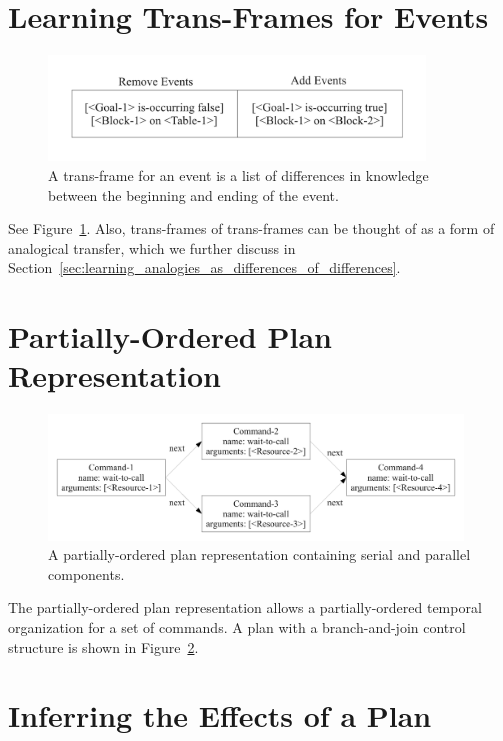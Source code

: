 \section{Learning Trans-Frames for Events}
\label{sec:learning_trans_frames_for_events}

\begin{figure}[bth]
  \center
  \includegraphics[width=10cm]{gfx/transframe}
  \caption[A trans-frame for an event]{A trans-frame for an event is a
    list of differences in knowledge between the beginning and ending
    of the event.}
  \label{fig:transframe}
\end{figure}

See Figure~\ref{fig:transframe}.  Also, trans-frames of trans-frames
can be thought of as a form of analogical transfer, which we further
discuss in
Section~\ref{sec:learning_analogies_as_differences_of_differences}.


\section{Partially-Ordered Plan Representation}

\begin{figure}[bth]
  \center
  \includegraphics[width=11cm]{gfx/serial_and_parallel_plan}
  \caption[A partially-ordered plan with serial and parallel
    components.]{A partially-ordered plan representation containing
    serial and parallel components.}
  \label{fig:serial_and_parallel_plan}
\end{figure}

The partially-ordered plan representation allows a partially-ordered
temporal organization for a set of commands.  A plan with a
branch-and-join control structure is shown in
Figure~\ref{fig:serial_and_parallel_plan}.


\section{Inferring the Effects of a Plan}
\label{sec:inferring_the_effects_of_a_plan}

